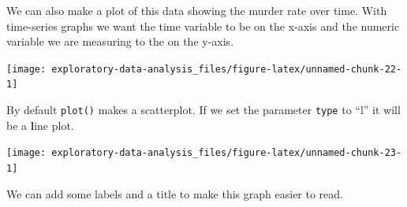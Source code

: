 \documentclass[
  12pt,
]{book}
\newenvironment{Shaded}{\begin{snugshade}}{\end{snugshade}}
\newcommand{\DataTypeTok}[1]{\textcolor[rgb]{0.13,0.29,0.53}{#1}}
\newcommand{\KeywordTok}[1]{\textcolor[rgb]{0.13,0.29,0.53}{\textbf{#1}}}
\newcommand{\NormalTok}[1]{#1}
\newcommand{\OperatorTok}[1]{\textcolor[rgb]{0.81,0.36,0.00}{\textbf{#1}}}
\newcommand{\StringTok}[1]{\textcolor[rgb]{0.31,0.60,0.02}{#1}}
\begin{document}
We can also make a plot of this data showing the murder rate over time. With time-series graphs we want the time variable to be on the x-axis and the numeric variable we are measuring to the on the y-axis.

\begin{Shaded}
\end{Shaded}

\begin{center}\texttt{[image: exploratory-data-analysis\_files/figure-latex/unnamed-chunk-22-1]} \end{center}

By default \texttt{plot()} makes a scatterplot. If we set the parameter \texttt{type} to ``l'' it will be a \textbf{l}ine plot.

\begin{Shaded}
\end{Shaded}

\begin{center}\texttt{[image: exploratory-data-analysis\_files/figure-latex/unnamed-chunk-23-1]} \end{center}

We can add some labels and a title to make this graph easier to read.

\begin{Shaded}
\end{Shaded}
\end{document}
